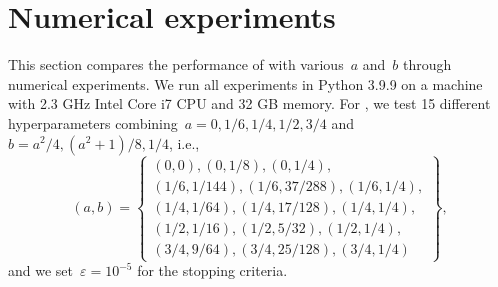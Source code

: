 \documentclass[../main]{subfiles}
\begin{document}
\section{Numerical experiments} 
This section compares the performance of  with various~$a$ and~$b$ through numerical experiments.
We run all experiments in Python 3.9.9 on a machine with 2.3 GHz Intel Core i7 CPU and 32 GB memory.
For , we test 15 different hyperparameters combining~$a = 0, 1 / 6, 1 / 4, 1 / 2, 3 / 4$ and~$b = a^2 / 4, (a^2 + 1) / 8, 1 / 4$, i.e.,
\begin{equation}
    (a, b) = \left\{
        \begin{gathered}
            (0, 0), (0, 1 / 8), (0, 1 / 4),\\
            (1 / 6, 1 / 144), (1 / 6, 37 / 288), (1 / 6, 1 / 4),\\
            (1 / 4, 1 / 64), (1 / 4, 17 / 128), (1 / 4, 1 / 4), \\
            (1 / 2, 1 / 16), (1 / 2, 5 / 32), (1 / 2, 1 / 4), \\
            (3 / 4, 9 / 64), (3 / 4, 25 / 128), (3 / 4, 1 / 4)
        \end{gathered}
    \right\},
\end{equation} 
and we set~$\varepsilon = 10^{-5}$ for the stopping criteria.
\end{document}
